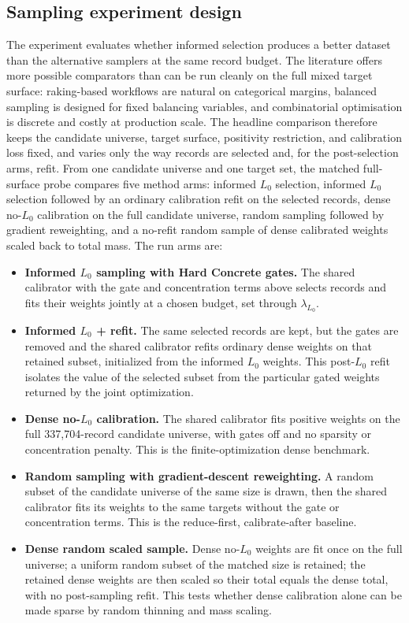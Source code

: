 \subsection{Sampling experiment design}
\label{sec:experiment_design}

The experiment evaluates whether informed selection produces a better dataset than the alternative
samplers at the same record budget. The literature offers more possible comparators than can be run
cleanly on the full mixed target surface: raking-based workflows are natural on categorical margins,
balanced sampling is designed for fixed balancing variables, and combinatorial optimisation is
discrete and costly at production scale. The headline comparison therefore keeps the candidate
universe, target surface, positivity restriction, and calibration loss fixed, and varies only the way
records are selected and, for the post-selection arms, refit. From one candidate universe and one target
set, the matched full-surface probe compares five method arms: informed $L_0$ selection, informed $L_0$
selection followed by an ordinary calibration refit on the selected records, dense no-$L_0$ calibration on
the full candidate universe, random sampling followed by gradient reweighting, and a no-refit random
sample of dense calibrated weights scaled back to total mass. The run arms are:

\begin{itemize}
    \item \textbf{Informed $L_0$ sampling with Hard Concrete gates.} The shared calibrator with the
    gate and concentration terms above selects records and fits their weights jointly at a chosen
    budget, set through $\lambda_{L_0}$.
    \item \textbf{Informed $L_0$ + refit.} The same selected records are kept, but the gates are removed
    and the shared calibrator refits ordinary dense weights on that retained subset, initialized from the
    informed $L_0$ weights. This post-$L_0$ refit isolates the value of the selected subset from the
    particular gated weights returned by the joint optimization.
    \item \textbf{Dense no-$L_0$ calibration.} The shared calibrator fits positive weights on the full
    337{,}704-record candidate universe, with gates off and no sparsity or concentration penalty. This is
    the finite-optimization dense benchmark.
    \item \textbf{Random sampling with gradient-descent reweighting.} A random subset of the candidate
    universe of the same size is drawn, then the shared calibrator fits its weights to the same targets
    without the gate or concentration terms. This is the reduce-first, calibrate-after baseline.
    \item \textbf{Dense random scaled sample.} Dense no-$L_0$ weights are fit once on the full universe;
    a uniform random subset of the matched size is retained; the retained dense weights are then scaled so
    their total equals the dense total, with no post-sampling refit. This tests whether dense calibration
    alone can be made sparse by random thinning and mass scaling.
\end{itemize}

